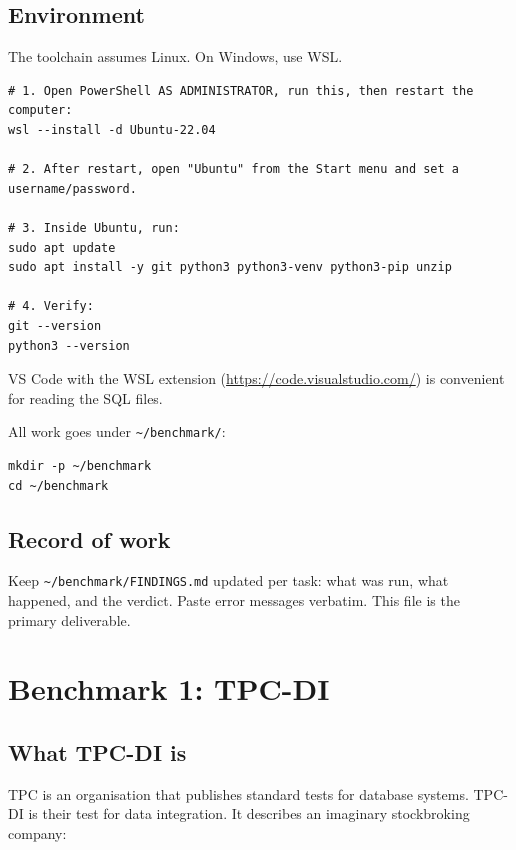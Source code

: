 \documentclass[11pt,a4paper]{article}
\newcommand{\code}[1]{\texttt{\small #1}}
\begin{document}
\subsection{Environment}

The toolchain assumes Linux. On Windows, use WSL.

\begin{lstlisting}[style=sh]
# 1. Open PowerShell AS ADMINISTRATOR, run this, then restart the computer:
wsl --install -d Ubuntu-22.04

# 2. After restart, open "Ubuntu" from the Start menu and set a username/password.

# 3. Inside Ubuntu, run:
sudo apt update
sudo apt install -y git python3 python3-venv python3-pip unzip

# 4. Verify:
git --version
python3 --version
\end{lstlisting}

VS Code with the WSL extension (\url{https://code.visualstudio.com/}) is convenient for
reading the SQL files.

\begin{notebox}
All work goes under \code{\textasciitilde/benchmark/}:
\begin{lstlisting}[style=sh]
mkdir -p ~/benchmark
cd ~/benchmark
\end{lstlisting}
\end{notebox}

\subsection{Record of work}

Keep \code{\textasciitilde/benchmark/FINDINGS.md} updated per task: what was run, what
happened, and the verdict. Paste error messages verbatim. This file is the primary
deliverable.

\clearpage
\section{Benchmark 1: TPC-DI}
\label{sec:tpcdi}

\subsection{What TPC-DI is}

TPC is an organisation that publishes standard tests for database systems. TPC-DI is their
test for data integration. It describes an imaginary stockbroking company:
\end{document}
